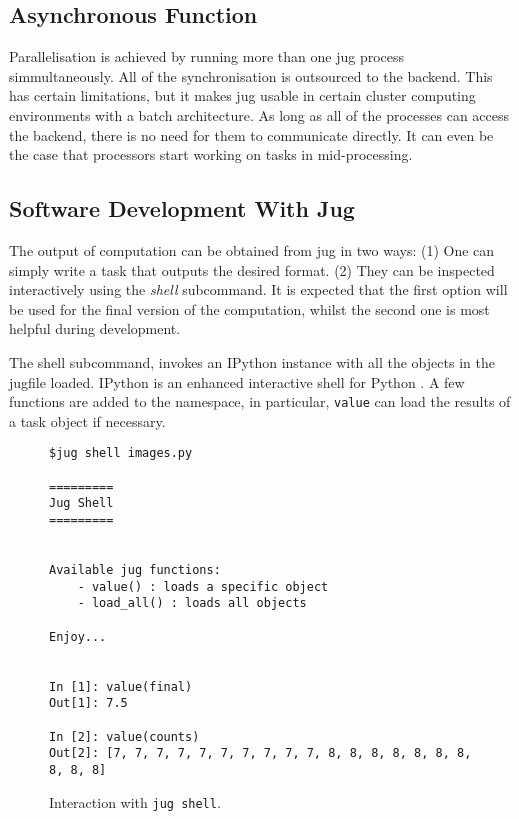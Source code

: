 \documentclass{article}
\let\code\texttt
\begin{document}
\subsection{Asynchronous Function}

Parallelisation is achieved by running more than one jug process
simmultaneously. All of the synchronisation is outsourced to the backend. This
has certain limitations, but it makes jug usable in certain cluster computing
environments with a batch architecture. As long as all of the processes can
access the backend, there is no need for them to communicate directly. It can
even be the case that processors start working on tasks in mid-processing.

\subsection{Software Development With Jug}

The output of computation can be obtained from jug in two ways: (1) One can
simply write a task that outputs the desired format. (2) They can be inspected
interactively using the \emph{shell} subcommand. It is expected that the first
option will be used for the final version of the computation, whilst the second
one is most helpful during development.

The shell subcommand, invokes an IPython instance with all the objects in the
jugfile loaded. IPython is an enhanced interactive shell for Python
\citep{Perez2007}. A few functions are added to the namespace, in particular,
\code{value} can load the results of a task object if necessary.

\begin{figure}
\begin{center}
\begin{verbatim}
$jug shell images.py

=========
Jug Shell
=========


Available jug functions:
    - value() : loads a specific object
    - load_all() : loads all objects

Enjoy...


In [1]: value(final)
Out[1]: 7.5

In [2]: value(counts)
Out[2]: [7, 7, 7, 7, 7, 7, 7, 7, 7, 7, 8, 8, 8, 8, 8, 8, 8, 8, 8, 8]
\end{verbatim}
\end{center}
\caption{Interaction with \code{jug shell}.}
\label{fig:jug-shell-interaction}
\end{figure}
\end{document}

